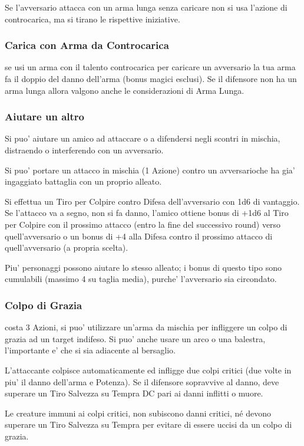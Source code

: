 \documentclass[a4paper,11pt,twoside,openany]{book}
\begin{document}
Se l'avversario attacca con un arma lunga senza caricare non si usa
l'azione di controcarica, ma si tirano le rispettive iniziative.

\subsubsection{Carica con Arma da Controcarica} se usi un arma con il talento controcarica per caricare un avversario la tua arma fa il doppio del danno dell'arma (bonus magici esclusi). Se il difensore non ha un arma lunga allora valgono anche le considerazioni di Arma Lunga.

\subsubsection{Aiutare un altro} Si puo' aiutare un amico ad attaccare o a difendersi negli scontri in mischia, distraendo o interferendo con un avversario.

Si puo' portare un attacco in mischia (1 Azione) contro un avversarioche ha gia' ingaggiato battaglia con un proprio alleato.

Si effettua un Tiro per Colpire contro Difesa dell'avversario con 1d6 di vantaggio. Se l'attacco va a segno, non si fa danno, l'amico ottiene bonus di +1d6 al Tiro per Colpire con il prossimo attacco (entro la fine del successivo round) verso quell'avversario o un bonus di +4 alla Difesa contro il prossimo attacco di quell'avversario (a propria scelta). 

Piu' personaggi possono aiutare lo stesso alleato; i bonus di questo tipo sono cumulabili (massimo 4 su taglia media), purche' l'avversario sia circondato.

\subsubsection{Colpo di Grazia} costa 3 Azioni, si puo' utilizzare un'arma da mischia per infliggere un colpo di grazia ad un target indifeso. Si puo' anche usare un arco o una balestra, l'importante e' che si sia adiacente al bersaglio.

L'attaccante colpisce automaticamente ed infligge due colpi critici (due volte in piu' il danno dell'arma e Potenza). Se il difensore sopravvive al danno, deve superare un Tiro Salvezza su Tempra DC pari ai danni inflitti o muore.

Le creature immuni ai colpi critici, non subiscono danni critici, né devono superare un Tiro Salvezza su Tempra per evitare di essere uccisi da un colpo di grazia.
\end{document}
